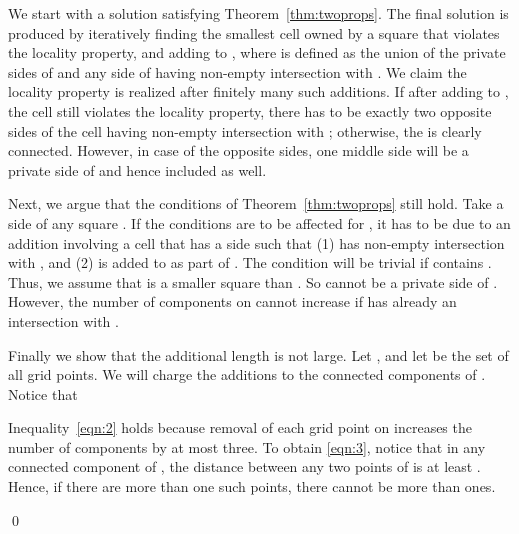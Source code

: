 \documentclass[extras,11pt]{article} \usepackage{fullpage}
\theoremstyle{mytheorem}
\newenvironment{proofof}[1]{\par\noindent{\bf #1.}\hspace{0.5em}}
    {\hfill\qed\vspace{1ex}}
\begin{document}
\begin{proofof}{\proofname\ of Theorem~\ref{thm:locality}}
We start with a solution  satisfying Theorem~\ref{thm:twoprops}.
The final solution is produced by iteratively finding the smallest cell  owned  by a square  that violates the locality property,
and adding  to , where  is defined as the union of 
the private sides of 
and
any side of  having non-empty intersection with .
We claim the locality property is realized after finitely many such additions.
If after adding  to , the cell  still violates the locality property, there has to  be exactly two opposite sides of the cell having non-empty intersection with ; otherwise, the  is clearly connected.
However, in case of the opposite sides, one middle side will be a private side of  and hence included as well.

Next, we argue that the conditions of Theorem~\ref{thm:twoprops} still hold.
Take a side  of any square .
If the conditions are to be affected for ,
it has to be due to an addition involving a cell  that has a side  such that
(1)  has non-empty intersection with , and (2)  is added to  as part of .
The condition will be trivial if  contains .
Thus, we assume that  is a smaller square than .
So  cannot be a private side of .
However, the number of components on  cannot increase if  has already an intersection with .


Finally we  show that the additional length is not large.
Let ,
and let  be the set of all grid points.
We will charge the additions to the connected components of .
Notice that

Inequality~\eqref{eqn:2} holds because removal of each grid point on  increases the number of components by at most three.
To obtain \eqref{eqn:3}, notice that in any connected component of ,
the distance between any two points of  is at least .
Hence, if there are more than one such points, there cannot be more than  ones.


\end{proofof}
\end{document}
